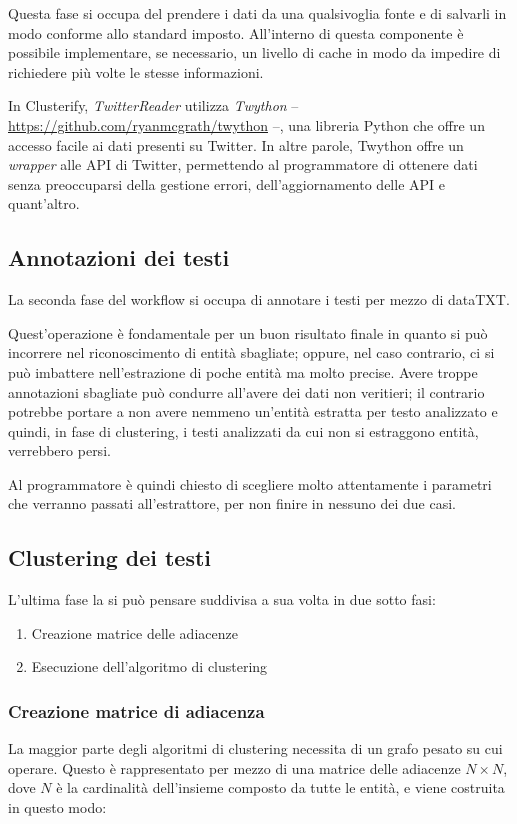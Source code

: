 		Questa fase si occupa del prendere i dati da una qualsivoglia fonte e di salvarli in modo conforme allo standard imposto. All'interno di questa componente è possibile implementare, se necessario, un livello di cache in modo da impedire di richiedere più volte le stesse informazioni.

		In Clusterify, \emph{TwitterReader} utilizza \emph{Twython}  -- \url{https://github.com/ryanmcgrath/twython} --, una libreria Python che offre un accesso facile ai dati presenti su Twitter. In altre parole, Twython offre un \emph{wrapper} alle API di Twitter, permettendo al programmatore di ottenere dati senza preoccuparsi della gestione errori, dell'aggiornamento delle API e quant'altro. 

	\subsection{Annotazioni dei testi}
		La seconda fase del workflow si occupa di annotare i testi per mezzo di dataTXT.
		
		Quest'operazione è fondamentale per un buon risultato finale in quanto si può  incorrere nel riconoscimento di entità sbagliate; oppure, nel caso contrario, ci si può imbattere nell'estrazione di poche entità ma molto precise. Avere troppe annotazioni sbagliate può condurre all'avere dei dati non veritieri; il contrario potrebbe portare a non avere nemmeno un'entità estratta per testo analizzato e quindi, in fase di clustering, i testi analizzati da cui non si estraggono entità, verrebbero persi.

		Al programmatore è quindi chiesto di scegliere molto attentamente i parametri che verranno passati all'estrattore, per non finire in nessuno dei due casi.

	\subsection{Clustering dei testi}
		L'ultima fase la si può pensare suddivisa a sua volta in due sotto fasi:

		\begin{enumerate}
  			\item Creazione matrice delle adiacenze
  			\item Esecuzione dell'algoritmo di clustering
		\end{enumerate} 

		\subsubsection{Creazione matrice di adiacenza}
			La maggior parte degli algoritmi di clustering necessita di un grafo pesato su cui operare. Questo è rappresentato per mezzo di una matrice delle adiacenze $N \times N$, dove $N$ è la cardinalità dell'insieme composto da tutte le entità, e viene costruita in questo modo:

